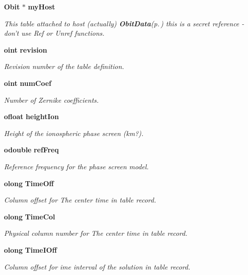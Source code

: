 \begin{CompactItemize}
{\bf Obit} $\ast$ {\bf my\-Host}
\begin{CompactList}\small\item\em This table attached to host (actually) {\bf Obit\-Data}{\rm (p.\,\pageref{structObitData})} this is a secret reference - don't use Ref or Unref functions. \item\end{CompactList}\item 
{\bf oint} {\bf revision}
\begin{CompactList}\small\item\em Revision number of the table definition. \item\end{CompactList}\item 
{\bf oint} {\bf num\-Coef}
\begin{CompactList}\small\item\em Number of Zernike coefficients. \item\end{CompactList}\item 
{\bf ofloat} {\bf height\-Ion}
\begin{CompactList}\small\item\em Height of the ionospheric phase screen (km?). \item\end{CompactList}\item 
{\bf odouble} {\bf ref\-Freq}
\begin{CompactList}\small\item\em Reference frequency for the phase screen model. \item\end{CompactList}\item 
{\bf olong} {\bf Time\-Off}
\begin{CompactList}\small\item\em Column offset for The center time in table record. \item\end{CompactList}\item 
{\bf olong} {\bf Time\-Col}
\begin{CompactList}\small\item\em Physical column number for The center time in table record. \item\end{CompactList}\item 
{\bf olong} {\bf Time\-IOff}
\begin{CompactList}\small\item\em Column offset for ime interval of the solution in table record. \item\end{CompactList}\item 

\end{CompactItemize}
